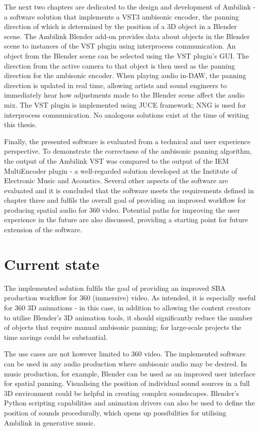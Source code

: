 The next two chapters are dedicated to the design and development of
Ambilink - a software solution that implements a VST3 ambisonic encoder, the panning direction
of which is determined by the position of a 3D object in a Blender scene.
The Ambilink Blender add-on provides data about objects in the Blender scene to 
instances of the VST plugin using interprocess communication.
An object from the Blender scene can be selected using the VST plugin's GUI.
The direction from the active camera to that object is then used as the 
panning direction for the ambisonic encoder. When playing audio in-DAW, the 
panning direction is updated in real time, allowing artists and sound engineers 
to immediately hear how adjustments made to the Blender scene affect the audio mix.
The VST plugin is implemented using JUCE framework; NNG is used for interprocess communication.
No analogous solutions exist at the time of writing this thesis.

Finally, the presented software is evaluated from a technical and user experience perspective.
To demonstrate the correctness of the ambisonic panning algorithm, 
the output of the Ambilink VST was compared to the output of the IEM MultiEncoder plugin -
a well-regarded solution developed at the Institute of Electronic Music and Acoustics.
Several other aspects of the software
are evaluated and it is concluded that the software meets the requirements defined in chapter three
and fulfils the overall goal of providing an improved workflow 
for producing spatial audio for 360\degree{} video.
Potential paths for improving the user experience in the future are also discussed, 
providing a starting point for future extension of the software.

\section{Current state}
The implemented solution fulfils the goal of providing an improved SBA production workflow 
for 360\degree{} (immersive) video. As intended, 
it is especially useful for 360\degree{} 3D animations - in this case,
in addition to allowing the content creators to utilise Blender's 3D animation tools, 
it should significantly reduce the number of objects that require manual ambisonic panning;
for large-scale projects the time savings could be substantial.

The use cases are not however limited to 360\degree{} video.
The implemented software can be used in any audio production where ambisonic audio may be desired.
In music production, for example, Blender can be used as an improved user interface for spatial panning.
Visualising the position of individual sound sources in a full 3D environment 
could be helpful in creating complex soundscapes. Blender's Python scripting capabilities and animation drivers can also be used
to define the position of sounds procedurally, which opens up possibilities for utilising Ambilink 
in generative music.

